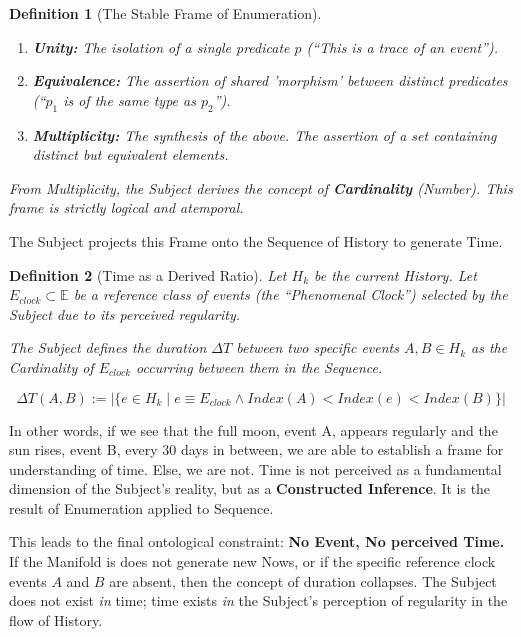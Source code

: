 \documentclass[11pt, a4paper]{article}
\theoremstyle{formalism}
\newtheorem{formalism}{Definition}
\begin{document}
{\begin{formalism}[The Stable Frame of Enumeration]
    \begin{enumerate}
        \item \textbf{Unity:} The isolation of a single predicate 
           $p$ (``This is a trace of an event'').

        \item \textbf{Equivalence:} The assertion of shared 'morphism' between 
           distinct predicates (``$p_1$ is of the same type as $p_2$'').

        \item \textbf{Multiplicity:} The synthesis of the above. The assertion of 
            a set containing distinct but equivalent elements.

    \end{enumerate}

    From Multiplicity, the Subject derives the concept of \textbf{Cardinality}
    (Number). This frame is strictly logical and atemporal.

\end{formalism}

The Subject projects this Frame onto the Sequence of History to generate Time.

\begin{formalism}[Time as a Derived Ratio]

    Let $H_k$ be the current History. Let $E_{clock} \subset \mathbb{E}$ be a
    reference class of events (the ``Phenomenal Clock'') selected by the
    Subject due to its perceived regularity.
    
    The Subject defines the duration $\Delta T$ between two specific events $A,
    B \in H_k$ as the Cardinality of $E_{clock}$ occurring between them in the
    Sequence.

    \begin{equation}
        \Delta T(A, B) := \Big| \{ e \in H_k \mid e \equiv E_{clock} \land Index(A) < Index(e) < Index(B) \} \Big|
    \end{equation}

\end{formalism}

In other words, if we see that the full moon, event A, appears regularly and
the sun rises, event B, every 30 days in between, we are able to establish a
frame for understanding of time. Else, we are not. Time is not perceived as a
fundamental dimension of the Subject's reality, but as a \textbf{Constructed
Inference}. It is the result of Enumeration applied to Sequence. 

This leads to the final ontological constraint: \textbf{No Event, No perceived Time.} If
the Manifold is does not generate new Nows, or if the specific reference clock events
$A$ and $B$ are absent, then the concept of duration collapses. The Subject
does not exist \textit{in} time; time exists \textit{in} the Subject's perception
of regularity in the flow of History.

}
\end{document}

